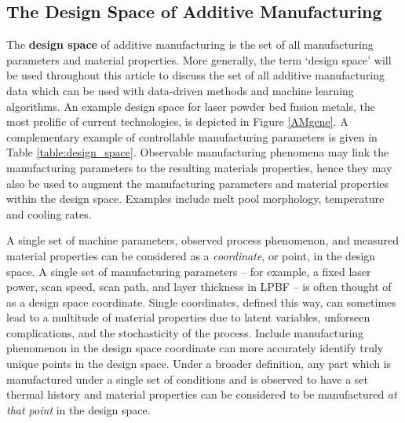 \subsection{The Design Space of Additive Manufacturing}
The \textbf{design space} of additive manufacturing is the set of all manufacturing parameters and material properties. More generally, the term `design space' will be used throughout this article to discuss the set of all additive manufacturing data which can be used with data-driven methods and machine learning algorithms. An example design space for laser powder bed fusion metals, the most prolific of current technologies, is depicted in Figure \ref{AMgene}. A complementary example of controllable manufacturing parameters is given in Table \ref{table:design_space}. Observable manufacturing phenomena may link the manufacturing parameters to the resulting materials properties, hence they may also be used to augment the manufacturing parameters and material properties within the design space. Examples include melt pool morphology, temperature and cooling rates.

A single set of machine parameters, observed process phenomenon, and measured material properties can be considered as a \textit{coordinate}, or point, in the design space. A single set of manufacturing parameters -- for example, a fixed laser power, scan speed, scan path, and layer thickness in LPBF -- is often thought of as a design space coordinate. Single coordinates, defined this way, can sometimes lead to a multitude of material properties due to latent variables, unforseen complications, and the stochasticity of the process. Include manufacturing phenomenon in the design space coordinate can more accurately identify truly unique points in the design space. Under a broader definition, any part which is manufactured under a single set of conditions and is observed to have a set thermal history and material properties can be considered to be manufactured \textit{at that point} in the design space.

